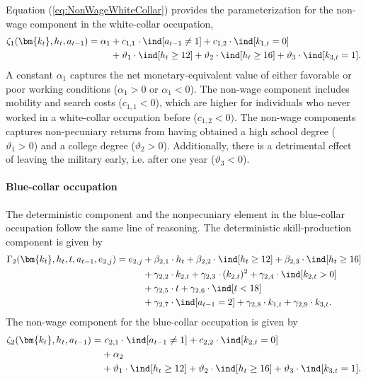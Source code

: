 Equation (\ref{eq:NonWageWhiteCollar}) provides the parameterization for the non-wage component in the white-collar occupation,
%
\begin{align}\label{eq:NonWageWhiteCollar}
\zeta_{1}(\bm{k_t}, h_t, a_{t-1}) = \alpha_1  & + c_{1,1} \cdot \ind[a_{t-1} \neq 1] + c_{1,2} \cdot \ind[k_{1,t} = 0] \nonumber \\
                            & + \vartheta_1 \cdot \ind[h_t \geq 12] + \vartheta_2 \cdot \ind[h_t \geq 16] + \vartheta_3 \cdot \ind[k_{3,t} = 1].
\end{align}
%
A constant $\alpha_1$ captures the net monetary-equivalent value of either favorable or poor working conditions ($\alpha_1 > 0$ or $\alpha_1 < 0$). The non-wage component includes mobility and search costs ($c_{1,1} < 0$), which are higher for individuals who never worked in a white-collar occupation before ($c_{1,2}< 0)$. The non-wage components captures non-pecuniary returns from having obtained a high school degree ($\vartheta_1 >0 $) and a college degree ($\vartheta_2 >0$). Additionally, there is a detrimental effect of leaving the military early, i.e. after one year ($\vartheta_3 < 0$).

\paragraph{Blue-collar occupation} The deterministic component and the nonpecuniary element in the blue-collar occupation follow the same line of reasoning. The deterministic skill-production component is given by
%
\begin{align*}
    \Gamma_2(\bm{k_t}, h_t, t, a_{t-1}, e_{2,j}) = e_{2,j} & + \beta_{2,1} \cdot h_t + \beta_{2, 2} \cdot \ind[h_t \geq 12] + \beta_{2,3} \cdot \ind[h_t\geq 16] \\
    							 & + \gamma_{2, 2} \cdot  k_{2,t} + \gamma_{2,3} \cdot  (k_{2,t})^2 + \gamma_{2,4} \cdot  \ind[k_{2,t} > 0] \\
                                   & + \gamma_{2,5} \cdot  t + \gamma_{2,6} \cdot \ind[t < 18] \\
                                  & + \gamma_{2,7} \cdot  \ind[a_{t-1} = 2]  + \gamma_{2,8} \cdot  k_{1,t} + \gamma_{2,9} \cdot  k_{3,t}.
\end{align*}
The non-wage component for the blue-collar occupation is given by
\begin{align*}
\zeta_{2}( \bm{k_t}, h_t, a_{t-1} ) = &~c_{2,1} \cdot \ind[a_{t-1} \neq 1] + c_{2,2} \cdot \ind[k_{2,t} = 0] \\
                            & + \alpha_2 \\
                            & + \vartheta_1 \cdot \ind[h_t \geq 12] + \vartheta_2 \cdot \ind[h_t \geq 16] + \vartheta_3 \cdot \ind[k_{3,t} = 1].
\end{align*}


